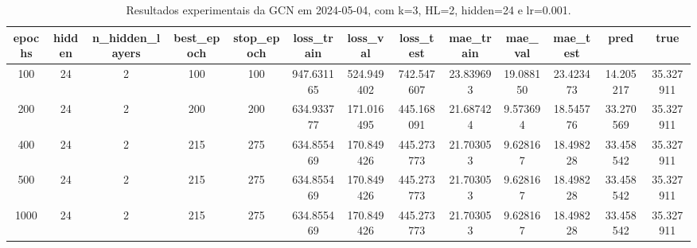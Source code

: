 \begin{table}[h]
\centering
\caption{Resultados experimentais da GCN em 2024-05-04, com k=3, HL=2, hidden=24 e lr=0.001.}
\label{tab:gcn_results_k3_hl2_h24_d20240504}
\begin{tabular}{ccccccccccccc}
\toprule
epochs & hidden & n\_hidden\_layers & best\_epoch & stop\_epoch & loss\_train & loss\_val & loss\_test & mae\_train & mae\_val & mae\_test & pred & true \\
\midrule
100 & 24 & 2 & 100 & 100 & 947.631165 & 524.949402 & 742.547607 & 23.839693 & 19.088150 & 23.423473 & 14.205217 & 35.327911 \\
200 & 24 & 2 & 200 & 200 & 634.933777 & 171.016495 & 445.168091 & 21.687424 & 9.573694 & 18.545776 & 33.270569 & 35.327911 \\
400 & 24 & 2 & 215 & 275 & 634.855469 & 170.849426 & 445.273773 & 21.703053 & 9.628167 & 18.498228 & 33.458542 & 35.327911 \\
500 & 24 & 2 & 215 & 275 & 634.855469 & 170.849426 & 445.273773 & 21.703053 & 9.628167 & 18.498228 & 33.458542 & 35.327911 \\
1000 & 24 & 2 & 215 & 275 & 634.855469 & 170.849426 & 445.273773 & 21.703053 & 9.628167 & 18.498228 & 33.458542 & 35.327911 \\
\bottomrule
\end{tabular}
\end{table}
